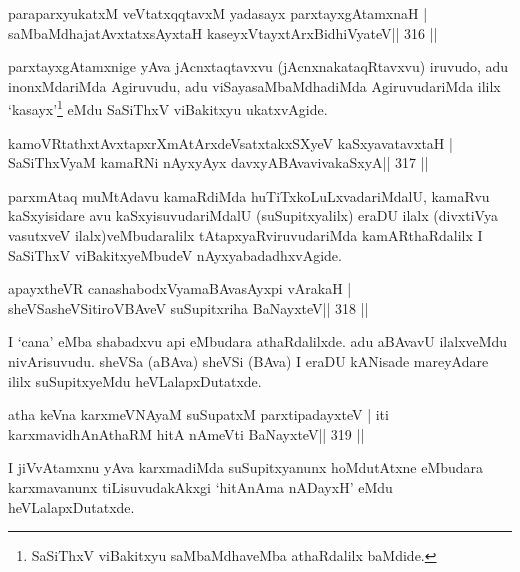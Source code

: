 \begin{shl}
paraparxyukatxM veVtatxqqtavxM yadasayx parxtayxgAtamxnaH |
saMbaMdhajatAvxtatxsAyxtaH kaseyxVtayxtArxBidhiVyateV\hfill || 316 ||
\end{shl}

\begin{artha}
parxtayxgAtamxnige yAva jAcnxtaqtavxvu (jAcnxnakataqRtavxvu) iruvudo, 
adu inonxMdariMda Agiruvudu, adu viSayasaMbaMdhadiMda AgiruvudariMda ililx `kasayx'\footnote{SaSiThxV viBakitxyu saMbaMdhaveMba athaRdalilx baMdide.} eMdu SaSiThxV viBakitxyu ukatxvAgide.
\end{artha}


\begin{shl}
kamoVRtathxtAvxtapxrXmAtArxdeVsatxtakxSXyeV kaSxyavatavxtaH |
SaSiThxVyaM kamaRNi nAyxyAyx davxyABAvavivakaSxyA\hfill || 317 ||
\end{shl}

\begin{artha}
parxmAtaq muMtAdavu kamaRdiMda huTiTxkoLuLxvadariMdalU, kamaRvu  kaSxyisidare avu kaSxyisuvudariMdalU (suSupitxyalilx) eraDU ilalx  (divxtiVya vasutxveV ilalx)veMbudaralilx tAtapxyaRviruvudariMda  kamARthaRdalilx I SaSiThxV viBakitxyeMbudeV nAyxyabadadhxvAgide.
\end{artha}


\begin{shl}
apayxtheVR canashabodxV\s yamaBAvasAyxpi vArakaH |
sheVSasheVSitiroVBAveV suSupitxriha BaNayxteV\hfill || 318 ||
\end{shl}

\begin{artha}
I `cana' eMba shabadxvu api eMbudara athaRdalilxde. adu aBAvavU ilalxveMdu nivArisuvudu. sheVSa (aBAva) sheVSi (BAva) I eraDU kANisade mareyAdare ililx suSupitxyeMdu heVLalapxDutatxde.
\end{artha}


\begin{shl}
atha keVna karxmeVNAyaM suSupatxM parxtipadayxteV |
iti karxmavidhAnAthaRM hitA nAmeVti BaNayxteV\hfill || 319 ||
\end{shl}

\begin{artha}
I jiVvAtamxnu yAva karxmadiMda suSupitxyanunx hoMdutAtxne eMbudara  karxmavanunx tiLisuvudakAkxgi `hitAnAma nADayxH' eMdu heVLalapxDutatxde.
\end{artha}

